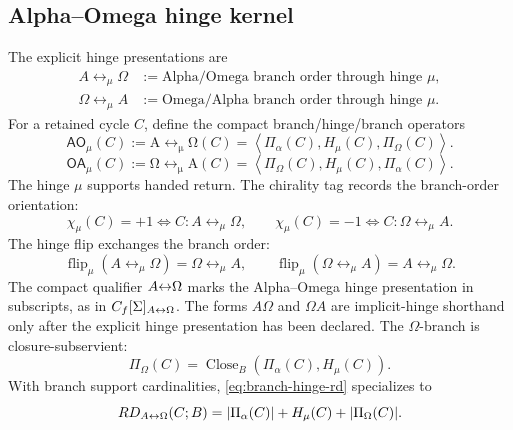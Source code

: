 \subsection{Alpha--Omega hinge kernel}\label{subsec:ao-kernel}
\begin{definition}
The explicit hinge presentations are
\begin{align*}
A\leftrightarrow_{\mu}\Omega
&:=
\text{Alpha/Omega branch order through hinge }\mu,\\
\Omega\leftrightarrow_{\mu}A
&:=
\text{Omega/Alpha branch order through hinge }\mu.
\end{align*}
For a retained cycle \(C\), define the compact branch/hinge/branch operators
\begin{equation}
\mathsf{AO}_{\mu}(C)
:=
\operatorname{A\leftrightarrow_{\mu}\Omega}(C)
=
\left\langle
\Pi_\alpha(C),
H_\mu(C),
\Pi_\Omega(C)
\right\rangle.
\label{eq:ao-kernel}
\end{equation}
\begin{equation}
\mathsf{OA}_{\mu}(C)
:=
\operatorname{\Omega\leftrightarrow_{\mu}A}(C)
=
\left\langle
\Pi_\Omega(C),
H_\mu(C),
\Pi_\alpha(C)
\right\rangle.
\label{eq:omega-alpha-hinge-kernel}
\end{equation}
The hinge \(\mu\) supports handed return. The chirality tag records the branch-order orientation:
\begin{equation}
\chi_\mu(C)=+1
\Longleftrightarrow
C:A\leftrightarrow_{\mu}\Omega,
\qquad
\chi_\mu(C)=-1
\Longleftrightarrow
C:\Omega\leftrightarrow_{\mu}A.
\label{eq:hinge-chirality-tag}
\end{equation}
The hinge flip exchanges the branch order:
\begin{equation}
\operatorname{flip}_\mu(A\leftrightarrow_{\mu}\Omega)=\Omega\leftrightarrow_{\mu}A,
\qquad
\operatorname{flip}_\mu(\Omega\leftrightarrow_{\mu}A)=A\leftrightarrow_{\mu}\Omega.
\label{eq:hinge-chirality-flip}
\end{equation}
The compact qualifier \(A{\leftrightarrow}\Omega\) marks the Alpha--Omega hinge presentation in subscripts, as in \(C_f[\Sigma]_{A{\leftrightarrow}\Omega}\). The forms \(A\Omega\) and \(\Omega A\) are implicit-hinge shorthand only after the explicit hinge presentation has been declared.
The \(\Omega\)-branch is closure-subservient:
\begin{equation}
\Pi_\Omega(C)=\operatorname{Close}_B(\Pi_\alpha(C),H_\mu(C)).
\label{eq:omega-close}
\end{equation}
With branch support cardinalities, \eqref{eq:branch-hinge-rd} specializes to
\begin{equation}
RD_{A{\leftrightarrow}\Omega}(C;B)
=
|\Pi_\alpha(C)|+H_\mu(C)+|\Pi_\Omega(C)|.
\label{eq:ao-rd-accessor-kernel}
\end{equation}
\end{definition}


